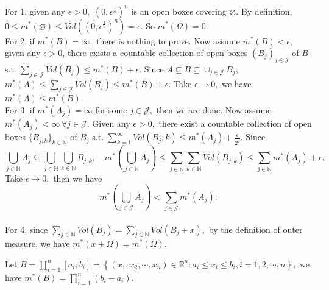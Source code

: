 \begin{pfbox}
    For 1, given any $\epsilon>0,$ $(0,\epsilon^{\frac{1}{n}})^{n}$ is an open boxes covering $\varnothing$.
    By definition, $0\le m^*(\varnothing)\le Vol((0,\epsilon^{\frac{1}{n}})^{n})=\epsilon.$ So $m^*(\Omega)=0.$\\

    For 2, if $m^*(B)=\infty,$ there is nothing to prove. Now assume $m^*(B)<\epsilon,$ given any $\epsilon>0$,
    there exists a countable collection of open boxes $(B_j)_{j\in\mathcal{J}}$ of $B$ s.t. $\sum_{j\in\mathcal{J}}Vol(B_j)\le m^*(B)+\epsilon$.
    Since $A\subseteq B\subseteq \cup_{j\in\mathcal{J}}B_j$, $m^*(A)\le \sum_{j\in\mathcal{J}}Vol(B_j)\le m^*(B)+\epsilon.$ Take $\epsilon\to 0,$ we have $m^*(A)\le m^*(B).$\\

    For 3, if $m^*(A_j)=\infty$ for some $j\in\mathcal{J},$ then we are done. Now assume $m^*(A_j)<\infty\,\forall j\in\mathcal{J}.$ Given any $\epsilon>0,$ there exist a countable collection of open boxes $\{B_{j,k}\}_{k\in\mathbb{N}}$ of $B_j$ s.t. $\sum_{k=1}^{\infty}Vol(B_j,k)\le m^*(A_j)+\frac{\epsilon}{2^j}$.
    Since $$\bigcup_{j\in\mathbb{N}} A_j\subseteq \bigcup_{j\in\mathbb{N}}\bigcup_{k\in\mathbb{N}} B_{j,k},\quad m^*(\bigcup_{j\in\mathbb{N}}A_j)\le\sum_{{j\in\mathbb{N}}}\sum_{{k\in\mathbb{N}}} Vol(B_{j,k})\le \sum_{j\in\mathbb{N}}m^*(A_j)+\epsilon.$$
    Take $\epsilon\to 0,$ then we have 
    $$m^*(\bigcup_{j\in\mathcal{J}}A_j)<\sum_{j\in\mathcal{J}}m^*(A_j).$$\\

    For 4, since $\sum_{j\in\mathbb{N}}Vol(B_j) = \sum_{j\in\mathbb{N}}Vol(B_j+x),$ by the definition of outer measure, we have $m^*(x+\Omega)=m^*(\Omega).$
\end{pfbox}



\begin{proposition}
    Let $B=\prod_{i=1}^{n}[a_i, b_i]=\left\{ (x_1,x_2,\cdots,x_n)\in\mathbb{R}^n:a_i\le x_i\le b_i, i=1,2,\cdots,n\right\},$ we have $m^*(B)=\prod_{i=1}^{n}(b_i-a_i).$
\end{proposition}

